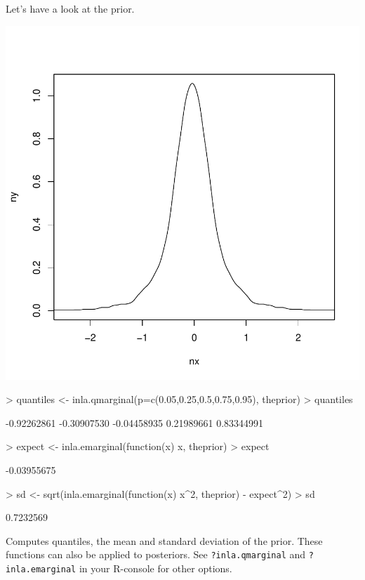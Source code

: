\documentclass[11pt]{article}
\newcommand{\para}{\bigskip\noindent}
\begin{document}
\para
Let's have a look at the prior.
\begin{Schunk}
\end{Schunk}
\includegraphics{ShrinkBayes-069}

\begin{Schunk}
\begin{Sinput}
> quantiles <- inla.qmarginal(p=c(0.05,0.25,0.5,0.75,0.95), theprior)
> quantiles
\end{Sinput}
\begin{Soutput}
[1] -0.92262861 -0.30907530 -0.04458935  0.21989661  0.83344991
\end{Soutput}
\begin{Sinput}
> expect <- inla.emarginal(function(x) x, theprior)
> expect
\end{Sinput}
\begin{Soutput}
[1] -0.03955675
\end{Soutput}
\begin{Sinput}
> sd <- sqrt(inla.emarginal(function(x) x^2, theprior) - expect^2)
> sd
\end{Sinput}
\begin{Soutput}
[1] 0.7232569
\end{Soutput}
\end{Schunk}
Computes quantiles, the mean and standard deviation of the prior. These functions can also be applied
to posteriors. See \texttt{?inla.qmarginal} and \texttt{?inla.emarginal} in your R-console for other options.
\end{document}
